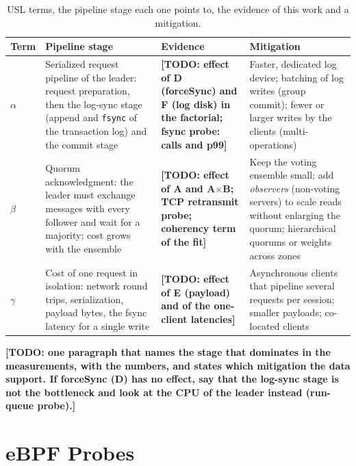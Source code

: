 \begin{table}[h]
  \centering
  \caption{USL terms, the pipeline stage each one points to, the evidence of this work and a mitigation.}
  \label{tab:limits}
  \footnotesize
  \begin{tabular}{@{}p{1.0cm}p{3.3cm}p{3.4cm}p{3.8cm}@{}}
    \toprule
    Term & Pipeline stage & Evidence & Mitigation \\
    \midrule
    $\alpha$ & Serialized request pipeline of the leader: request preparation, then the log-sync stage
      (append and \texttt{fsync} of the transaction log) and the commit stage
      & \textbf{[TODO: effect of D (forceSync) and F (log disk) in the factorial; fsync probe: calls and p99]}
      & Faster, dedicated log device; batching of log writes (group commit); fewer or larger writes by the
        clients (multi-operations) \\
    $\beta$ & Quorum acknowledgment: the leader must exchange messages with every follower and wait for a
      majority; cost grows with the ensemble
      & \textbf{[TODO: effect of A and A$\times$B; TCP retransmit probe; coherency term of the fit]}
      & Keep the voting ensemble small; add \emph{observers} (non-voting servers) to scale reads without enlarging
        the quorum; hierarchical quorums or weights across zones \\
    $\gamma$ & Cost of one request in isolation: network round trips, serialization, payload bytes, the fsync
      latency for a single write
      & \textbf{[TODO: effect of E (payload) and of the one-client latencies]}
      & Asynchronous clients that pipeline several requests per session; smaller payloads; co-located clients \\
    \bottomrule
  \end{tabular}
\end{table}

\textbf{[TODO: one paragraph that names the stage that dominates in the measurements, with the numbers, and
states which mitigation the data support. If forceSync (D) has no effect, say that the log-sync stage is not the
bottleneck and look at the CPU of the leader instead (run-queue probe).]}

\section{eBPF Probes}
\label{sec:ebpf}

